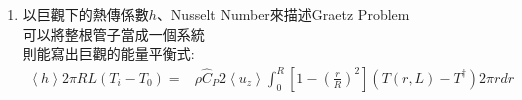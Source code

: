 \documentclass[../main.tex]{subfiles}
\begin{document}
\begin{itemize}
\begin{enumerate}
    也就是說，假設我們希望$\theta_{\text{AMC}}=0.1$，也就是100度被0度淨泡冷卻到10度\\
    那我們可以算出:
    \begin{equation}
      \theta_{\text{AMC}} = 0.1 = 0.819 e^{-2.704^2 z^\ast} + 0.098 e^{-6.679^2 z^\ast}\cdots
    \end{equation}
    假設只取第一項就好，那就能算出$z^\ast\approx 0.2876$\\
    代回去$z^\ast$的定義，就能算出需要多長的管子
    \begin{equation}
      L = z^\ast \cdot \frac{2 \rho \hat C_P \overline{u_z} R^2}{k} = 
      0.2876 \cdot \frac{2 \rho \hat C_P \overline{u_z} R^2}{k} = 0.2876 R \text{Pe}
    \end{equation}
    如果以管子直徑($D=2R$)來當作特徵長度，則
    \begin{align}
      \boxed{\frac{L}{D} = 0.144 \text{Pe}}
    \end{align}
    也就是說，假設今天Pe算出來是1000，那我們需要的管長就是$L/D = 144$倍管直徑\\
    但這個解析解只能用在想要知道到達某個溫度所需長度的情況\\
    如果想要知道整個的溫度分布$\theta(z^\ast)$，換句話說，可能在靠近入口處\\
    $\theta_{\text{AMC}}=0.99$，之類的，\\
    就會需要接近無窮多項的數值解才能逼近的算出該位置($z^\ast$)\\
    因此這樣的近似是不夠好的\\
    這原因也能從我們的邊界條件看出\\
    因為我們既要求$\theta(1,z^\ast)=0$，又要求$\theta(r^\ast,0)=1$\\
    這\\
    因此需要無窮多項的解才能逼近這個不連續點\\
    這也是為什麼要介紹下面章節的，Leveque的方法\\
    但在這之前，還有一點要介紹
    \item 以巨觀下的熱傳係數$h$、Nusselt Number來描述Graetz Problem\\
    可以將整根管子當成一個系統\\
    則能寫出巨觀的能量平衡式:
    \begin{align}
      \left<h\right> 2\pi RL (T_i - T_0) =&\rho \hat C_P 2\left<u_z\right> \int_0^R\left[
        1 - \left(\frac{r}{R}\right)^2
      \right]\left(T(r,L)-T^\dagger \right)2\pi r dr \nonumber\\

\end{align}
\end{enumerate}
\end{itemize}
\end{document}
